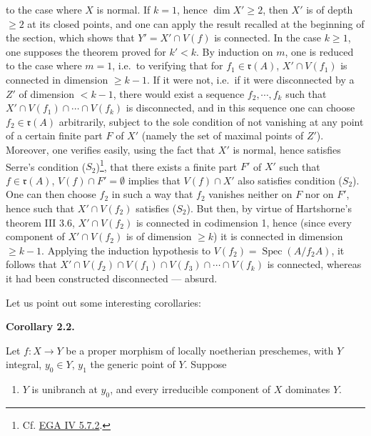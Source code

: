 \documentclass[
  11pt,
  a4paper,
]{book}
\providecommand{\tightlist}{%
  \setlength{\itemsep}{0pt}\setlength{\parskip}{0pt}}
\begin{document}
to the case where \(X\) is normal. If \(k = 1\), hence
\(\dim X' \geqslant 2\), then \(X'\) is of depth \(\geqslant 2\) at its
closed points, and one can apply the result recalled at the beginning of
the section, which shows that \(Y' = X' \cap
V(f)\) is connected. In the case \(k \geqslant 1\), one supposes the
theorem proved for \(k' < k\). By induction on \(m\), one is reduced to
the case where \(m = 1\), i.e.~to verifying that for
\(f_{1} \in \mathfrak{r}(A)\), \(X' \cap V(f_{1})\) is connected in
dimension \(\geqslant k - 1\). If it were not, i.e.~if it were
disconnected by a \(Z'\) of dimension \(< k - 1\), there would exist a
sequence \(f_{2}, \cdots, f_{k}\) such that
\(X' \cap V(f_{1}) \cap \cdots \cap V(f_{k})\) is disconnected, and in
this sequence one can choose \(f_{2} \in \mathfrak{r}(A)\) arbitrarily,
subject to the sole condition of not vanishing at any point of a certain
finite part \(F\) of \(X'\) (namely the set of maximal points of
\(Z'\)). Moreover, one verifies easily, using the fact that \(X'\) is
normal, hence satisfies Serre's condition (\(S_{2}\))\footnote{Cf.
  \href{https://jcreinhold.github.io/ega/iv/17-ch4-05-dimension-depth-regularity.html\#57-depth-and-property-sn}{EGA
  IV 5.7.2}.}, that there exists a finite part \(F'\) of \(X'\) such
that \(f \in \mathfrak{r}(A)\), \(V(f) \cap F' = \emptyset\) implies
that \(V(f)
\cap X'\) also satisfies condition (\(S_{2}\)). One can then choose
\(f_{2}\) in such a way that \(f_{2}\) vanishes neither on \(F\) nor on
\(F'\), hence such that \(X' \cap V(f_{2})\) satisfies (\(S_{2}\)). But
then, by virtue of Hartshorne's theorem III 3.6, \(X' \cap V(f_{2})\) is
connected in codimension 1, hence (since every component of
\(X' \cap V(f_{2})\) is of dimension \(\geqslant k\)) it is connected in
dimension \(\geqslant k - 1\). Applying the induction hypothesis to
\(V(f_{2})
= \operatorname{Spec}(A/f_{2}A)\), it follows that
\(X' \cap V(f_{2}) \cap V(f_{1}) \cap V(f_{3}) \cap \cdots \cap
V(f_{k})\) is connected, whereas it had been constructed disconnected
--- absurd.

Let us point out some interesting corollaries:

\textbf{Corollary 2.2.}

Let \(f : X \to Y\) be a proper morphism of locally noetherian
preschemes, with \(Y\) integral, \(y_{0} \in Y\), \(y_{1}\) the generic
point of \(Y\). Suppose

\begin{enumerate}
\def\labelenumi{\alph{enumi})}
\tightlist
\item
  \(Y\) is unibranch at \(y_{0}\), and every irreducible component of
  \(X\) dominates \(Y\).
\end{enumerate}
\end{document}
